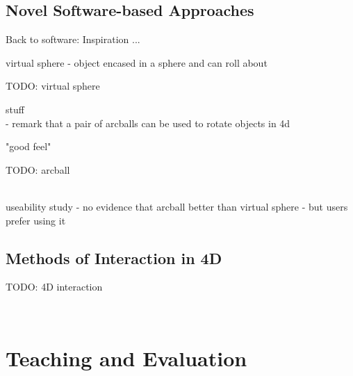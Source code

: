 \documentclass{l4proj}
\begin{document}
\subsection*{Novel Software-based Approaches}

Back to software: Inspiration ...

\citep{chen_study_1988}

virtual sphere - object encased in a sphere and can roll about

TODO: virtual sphere

stuff
\citep{shoemake_arcball_1994}\\
 -  remark that a pair of arcballs can be used to rotate objects in 4d

"good feel"

TODO: arcball

\citep{hinckley_usability_1997}\\

useability study - no evidence that arcball better than virtual sphere - but users prefer using it

\subsection{Methods of Interaction in 4D}

TODO: 4D interaction

\citep{murata_interactive_2000}\\
\citep{kageyama_keyboard-based_2005}

\section{Teaching and Evaluation}
\label{teaching_and_eval}
\end{document}
